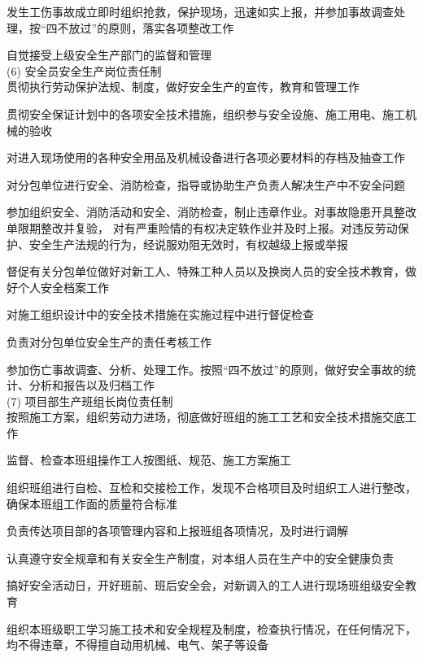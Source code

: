  发生工伤事故成立即时组织抢救，保护现场，迅速如实上报，并参加事故调查处理，按“四不放过”的原则，落实各项整改工作

 自觉接受上级安全生产部门的监督和管理\\


(6) 安全员安全生产岗位责任制\\

 贯彻执行劳动保护法规、制度，做好安全生产的宣传，教育和管理工作

 贯彻安全保证计划中的各项安全技术措施，组织参与安全设施、施工用电、施工机械的验收

 对进入现场使用的各种安全用品及机械设备进行各项必要材料的存档及抽查工作

 对分包单位进行安全、消防检查，指导或协助生产负责人解决生产中不安全问题

 参加组织安全、消防活动和安全、消防检查，制止违章作业。对事故隐患开具整改单限期整改并复验，
对有严重险情的有权决定轶作业并及时上报。对违反劳动保护、安全生产法规的行为，经说服劝阻无效时，有权越级上报或举报

 督促有关分包单位做好对新工人、特殊工种人员以及换岗人员的安全技术教育，做好个人安全档案工作

 对施工组织设计中的安全技术措施在实施过程中进行督促检查

 负责对分包单位安全生产的责任考核工作

 参加伤亡事故调查、分析、处理工作。按照“四不放过”的原则，做好安全事故的统计、分析和报告以及归档工作\\

(7) 项目部生产班组长岗位责任制\\

 按照施工方案，组织劳动力进场，彻底做好班组的施工工艺和安全技术措施交底工作

 监督、检查本班组操作工人按图纸、规范、施工方案施工

 组织班组进行自检、互检和交接检工作，发现不合格项目及时组织工人进行整改，确保本班组工作面的质量符合标准

 负责传达项目部的各项管理内容和上报班组各项情况，及时进行调解

 认真遵守安全规章和有关安全生产制度，对本组人员在生产中的安全健康负责

 搞好安全活动日，开好班前、班后安全会，对新调入的工人进行现场班组级安全教育

 组织本班级职工学习施工技术和安全规程及制度，检查执行情况，在任何情况下，均不得违章，不得擅自动用机械、电气、架子等设备


